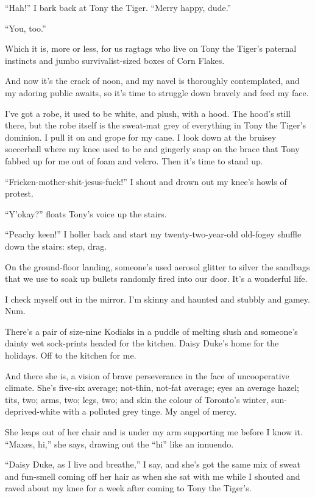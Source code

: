 ``Hah!'' I bark back at Tony the Tiger. ``Merry happy, dude.''

``You, too.''

Which it is, more or less, for us ragtags who live on Tony the
Tiger's paternal instincts and jumbo survivalist-sized boxes of
Corn Flakes.

And now it's the crack of noon, and my navel is thoroughly
contemplated, and my adoring public awaits, so it's time to
struggle down bravely and feed my face.

I've got a robe, it used to be white, and plush, with a hood. The
hood's still there, but the robe itself is the sweat-mat grey of
everything in Tony the Tiger's dominion. I pull it on and grope for
my cane. I look down at the bruisey soccerball where my knee used
to be and gingerly snap on the brace that Tony fabbed up for me out
of foam and velcro. Then it's time to stand up.

``Fricken-mother-shit-jesus-fuck!'' I shout and drown out my knee's
howls of protest.

``Y'okay?'' floats Tony's voice up the stairs.

``Peachy keen!'' I holler back and start my twenty-two-year-old
old-fogey shuffle down the stairs: step, drag.

On the ground-floor landing, someone's used aerosol glitter to
silver the sandbags that we use to soak up bullets randomly fired
into our door. It's a wonderful life.

I check myself out in the mirror. I'm skinny and haunted and
stubbly and gamey. Num.

There's a pair of size-nine Kodiaks in a puddle of melting slush
and someone's dainty wet sock-prints headed for the kitchen. Daisy
Duke's home for the holidays. Off to the kitchen for me.

And there she is, a vision of brave perseverance in the face of
uncooperative climate. She's five-six average; not-thin, not-fat
average; eyes an average hazel; tits, two; arms, two; legs, two;
and skin the colour of Toronto's winter, sun-deprived-white with a
polluted grey tinge. My angel of mercy.

She leaps out of her chair and is under my arm supporting me before
I know it. ``Maxes, hi,'' she says, drawing out the ``hi'' like an
innuendo.

``Daisy Duke, as I live and breathe,'' I say, and she's got the
same mix of sweat and fun-smell coming off her hair as when she sat
with me while I shouted and raved about my knee for a week after
coming to Tony the Tiger's.

